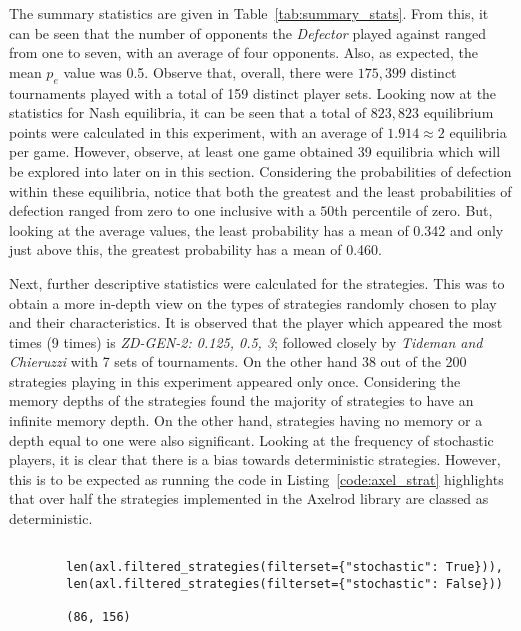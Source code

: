 The summary statistics are given in Table~\ref{tab:summary_stats}. From this, it can be
seen that the number of opponents the \textit{Defector} played against ranged
from one to seven, with an average of four opponents. Also, as expected, the
mean \(p_{e}\) value was 0.5. Observe that, overall,
there were \(175,399\) distinct tournaments played with a total of 159 distinct
player sets. 
Looking now at the statistics for Nash equilibria, it can be seen that a total
of \(823,823\) equilibrium points were calculated in this experiment, with an
average of \(1.914 \approx 2\) equilibria per game. However, observe, at least
one game obtained 39 equilibria which will be explored into later on in this
section. Considering the probabilities of defection within these equilibria,
notice that both the greatest and the least probabilities of defection ranged
from zero to one inclusive with a \(50\)th percentile of zero. But, looking at
the average values, the least probability has a mean of 0.342 and only just
above this, the greatest probability has a mean of 0.460.

Next, further descriptive statistics were calculated for the strategies. This was
to obtain a more in-depth view on the types of strategies randomly chosen to
play and their characteristics. It is observed that the player which appeared the most
times (9 times) is \textit{ZD-GEN-2: 0.125, 0.5, 3}; followed closely by
\textit{Tideman and Chieruzzi} with 7 sets of tournaments. On the other hand 38
out of the 200 strategies playing in this experiment appeared only once.
Considering the memory
depths of the strategies found the majority of strategies to have an infinite
memory depth. On the other hand, strategies having no memory or a depth equal to
one were also significant. Looking at the frequency of stochastic players,
it is clear that there is a bias towards deterministic strategies. However, this
is to be expected as running the code in Listing~\ref{code:axel_strat} highlights
that over half the strategies implemented in the Axelrod library are
classed as deterministic.

\begin{listing}
    \begin{verbatim}
    
        len(axl.filtered_strategies(filterset={"stochastic": True})), 
        len(axl.filtered_strategies(filterset={"stochastic": False}))

        (86, 156)
    \end{verbatim}
\end{listing}\label{code:axel_strat}


